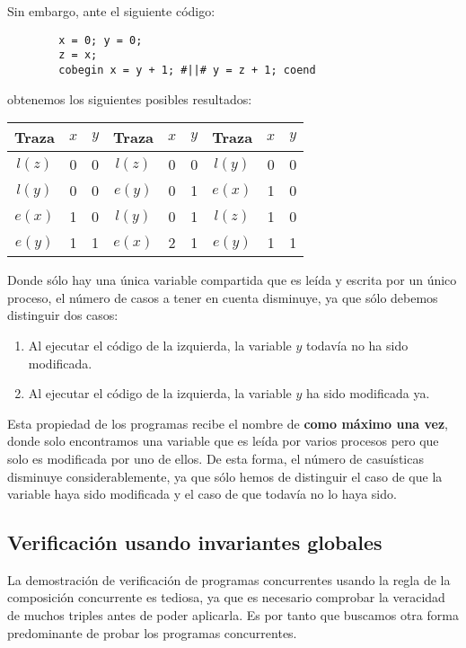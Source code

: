 \begin{ejemplo}
    Sin embargo, ante el siguiente código:
    \begin{verbatim}
        x = 0; y = 0;
        z = x;
        cobegin x = y + 1; #||# y = z + 1; coend
    \end{verbatim}
    obtenemos los siguientes posibles resultados:
    \begin{table}[H]
    \centering
    \begin{tabular}{|c|c|c||c|c|c||c|c|c|}
        \hline
        Traza & $x$ & $y$ &Traza & $x$ & $y$ &Traza & $x$ & $y$ \\
        \hline
        $l(z)$ & 0 & 0 & $l(z)$ & 0 & 0 & $l(y)$ & 0 & 0      \\
        \hline                                                        
        $l(y)$ & 0 & 0 & $e(y)$ & 0 & 1 & $e(x)$ & 1 & 0  \\
        \hline                                                            
        $e(x)$ & 1 & 0 & $l(y)$ & 0 & 1 & $l(z)$ & 1 & 0      \\
        \hline                                                            
        $e(y)$ & 1 & 1 & $e(x)$ & 2 & 1 & $e(y)$ & 1 & 1  \\
        \hline
    \end{tabular}
    \end{table}
    Donde sólo hay una única variable compartida que es leída y escrita por un único proceso, el número de casos a tener en cuenta disminuye, ya que sólo debemos distinguir dos casos:
    \begin{enumerate}
        \item Al ejecutar el código de la izquierda, la variable $y$ todavía no ha sido modificada.
        \item Al ejecutar el código de la izquierda, la variable $y$ ha sido modificada ya.
    \end{enumerate}
    Esta propiedad de los programas recibe el nombre de \textbf{como máximo una vez}, donde solo encontramos una variable que es leída por varios procesos pero que solo es modificada por uno de ellos. De esta forma, el número de casuísticas disminuye considerablemente, ya que sólo hemos de distinguir el caso de que la variable haya sido modificada y el caso de que todavía no lo haya sido.
\end{ejemplo}

\subsection{Verificación usando invariantes globales}
La demostración de verificación de programas concurrentes usando la regla de la composición concurrente es tediosa, ya que es necesario comprobar la veracidad de muchos triples antes de poder aplicarla. Es por tanto que buscamos otra forma predominante de probar los programas concurrentes.\\


